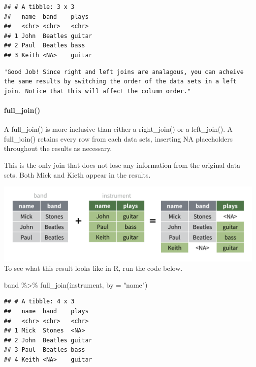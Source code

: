 \documentclass[
]{article}
\newenvironment{Shaded}{\begin{snugshade}}{\end{snugshade}}
\newcommand{\AttributeTok}[1]{\textcolor[rgb]{0.77,0.63,0.00}{#1}}
\newcommand{\FunctionTok}[1]{\textcolor[rgb]{0.00,0.00,0.00}{#1}}
\newcommand{\NormalTok}[1]{#1}
\newcommand{\SpecialCharTok}[1]{\textcolor[rgb]{0.00,0.00,0.00}{#1}}
\newcommand{\StringTok}[1]{\textcolor[rgb]{0.31,0.60,0.02}{#1}}
\begin{document}
\begin{verbatim}
## # A tibble: 3 x 3
##   name  band    plays 
##   <chr> <chr>   <chr> 
## 1 John  Beatles guitar
## 2 Paul  Beatles bass  
## 3 Keith <NA>    guitar
\end{verbatim}

\begin{verbatim}
"Good Job! Since right and left joins are analagous, you can acheive the same results by switching the order of the data sets in a left join. Notice that this will affect the column order."
\end{verbatim}

\hypertarget{full_join}{%
\paragraph{full\_join()}\label{full_join}}

A full\_join() is more inclusive than either a right\_join() or a
left\_join(). A full\_join() retains every row from each data sets,
inserting NA placeholders throughout the results as necessary.

This is the only join that does not lose any information from the
original data sets. Both Mick and Kieth appear in the results.

\includegraphics{data/full-join.png} To see what this result looks like
in R, run the code below.

\begin{Shaded}
\begin{Highlighting}[]
\NormalTok{band }\SpecialCharTok{\%\textgreater{}\%} \FunctionTok{full\_join}\NormalTok{(instrument, }\AttributeTok{by =} \StringTok{"name"}\NormalTok{)}
\end{Highlighting}
\end{Shaded}

\begin{verbatim}
## # A tibble: 4 x 3
##   name  band    plays 
##   <chr> <chr>   <chr> 
## 1 Mick  Stones  <NA>  
## 2 John  Beatles guitar
## 3 Paul  Beatles bass  
## 4 Keith <NA>    guitar
\end{verbatim}
\end{document}
